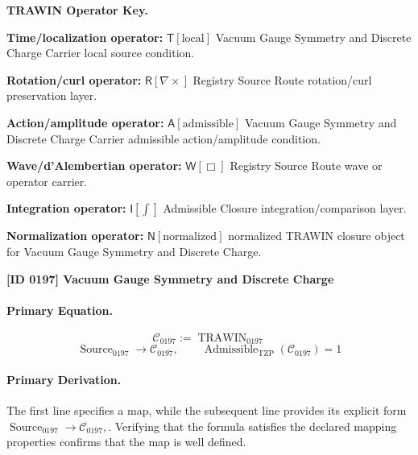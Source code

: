\par\vspace{0.45\baselineskip}
\noindent\begin{minipage}[t]{\linewidth}
\begingroup
\small
\raggedright
\textbf{TRAWIN Operator Key.}\par
\noindent\textbf{Time/localization operator:} $\mathsf{T}\!\left[\mathrm{local}\right]$ Vacuum Gauge Symmetry and Discrete Charge Carrier local source condition.\par
\noindent\textbf{Rotation/curl operator:} $\mathsf{R}\!\left[\nabla\times\right]$ Registry Source Route rotation/curl preservation layer.\par
\noindent\textbf{Action/amplitude operator:} $\mathsf{A}\!\left[\mathrm{admissible}\right]$ Vacuum Gauge Symmetry and Discrete Charge Carrier admissible action/amplitude condition.\par
\noindent\textbf{Wave/d'Alembertian operator:} $\mathsf{W}\!\left[\Box\right]$ Registry Source Route wave or operator carrier.\par
\noindent\textbf{Integration operator:} $\mathsf{I}\!\left[\int\right]$ Admissible Closure integration/comparison layer.\par
\noindent\textbf{Normalization operator:} $\mathsf{N}\!\left[\mathrm{normalized}\right]$ normalized TRAWIN closure object for Vacuum Gauge Symmetry and Discrete Charge.\par
\endgroup
\end{minipage}

\clearpage
\noindent\textbf{[ID 0197] Vacuum Gauge Symmetry and Discrete Charge}\par
\vspace{0.35em}
\paragraph{Primary Equation.}
\[
\mathcal{C}_{0197} := \operatorname{TRAWIN}_{0197}
\]
\[
\operatorname{Source}_{0197}\longrightarrow \mathcal{C}_{0197},
\qquad
\operatorname{Admissible}_{\mathrm{TZP}}\!\left(\mathcal{C}_{0197}\right)=1
\]

\paragraph{Primary Derivation.}
The first line specifies a map, while the subsequent line provides its explicit form \( \operatorname{Source}_{0197}\longrightarrow \mathcal{C}_{0197}, \). Verifying that the formula satisfies the declared mapping properties confirms that the map is well defined.
